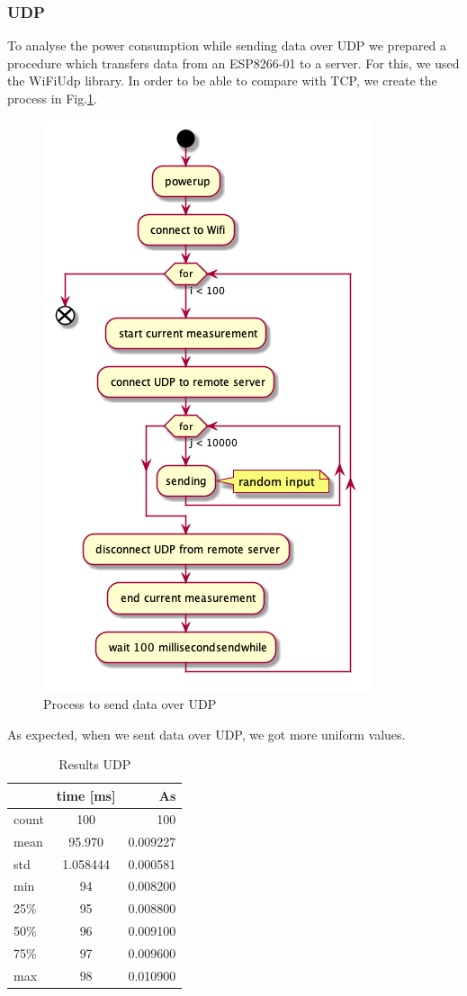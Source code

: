 \subsubsection{UDP}
To analyse the power consumption while sending data over UDP we prepared a procedure which
transfers data from an ESP8266-01 to a server. For this, we used the WiFiUdp library.
In order to be able to compare with TCP, we create the process in Fig.\ref{fig:udp_uml}.
\linebreak\
\begin{figure}[H]
\centering
\includegraphics[width = 0.7 \linewidth]{fig/udp_tcp/udp_uml.png}
\caption{Process to send data over UDP}
\label{fig:udp_uml}
\end{figure}
As expected, when we sent data over UDP, we got more uniform values.
\linebreak\linebreak
\begin{table}[H]
\begin{center}
\caption{Results UDP}
\label{tab:table2}
\renewcommand{\arraystretch}{1.8}
\begin{tabular}{l|c|r}
& \textbf{time [ms]} & \textbf{As}\\
\hline
count & 100 & 100\\
mean & 95.970 & 0.009227\\
std & 1.058444 & 0.000581\\
min & 94 & 0.008200\\
25\% & 95 & 0.008800\\
50\% & 96 & 0.009100\\
75\% & 97 & 0.009600\\
max & 98 & 0.010900\\
\end{tabular}
\end{center}
\end{table}
